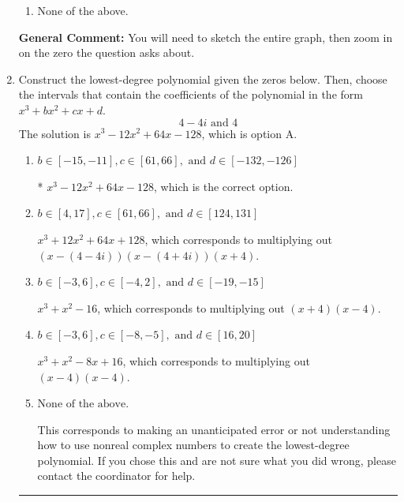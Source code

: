 \documentclass{extbook}[14pt]
\newcommand{\litem}[1]{\item #1

\rule{\textwidth}{0.4pt}}
\begin{document}
\begin{enumerate}
{\begin{enumerate}[label=\Alph*.]
\item None of the above.\end{enumerate}
\textbf{General Comment:} You will need to sketch the entire graph, then zoom in on the zero the question asks about.
}
\litem{
Construct the lowest-degree polynomial given the zeros below. Then, choose the intervals that contain the coefficients of the polynomial in the form $x^3+bx^2+cx+d$.
\[ 4 - 4 i \text{ and } 4 \]The solution is \( x^{3} -12 x^{2} +64 x -128 \), which is option A.\begin{enumerate}[label=\Alph*.]
\item \( b \in [-15, -11], c \in [61, 66], \text{ and } d \in [-132, -126] \)

* $x^{3} -12 x^{2} +64 x -128$, which is the correct option.
\item \( b \in [4, 17], c \in [61, 66], \text{ and } d \in [124, 131] \)

$x^{3} +12 x^{2} +64 x + 128$, which corresponds to multiplying out $(x-(4 - 4 i))(x-(4 + 4 i))(x + 4)$.
\item \( b \in [-3, 6], c \in [-4, 2], \text{ and } d \in [-19, -15] \)

$x^{3} + x^{2} -16$, which corresponds to multiplying out $(x + 4)(x -4)$.
\item \( b \in [-3, 6], c \in [-8, -5], \text{ and } d \in [16, 20] \)

$x^{3} + x^{2} -8 x + 16$, which corresponds to multiplying out $(x -4)(x -4)$.
\item \( \text{None of the above.} \)

This corresponds to making an unanticipated error or not understanding how to use nonreal complex numbers to create the lowest-degree polynomial. If you chose this and are not sure what you did wrong, please contact the coordinator for help.
\end{enumerate}

}
\end{enumerate}
\end{document}

